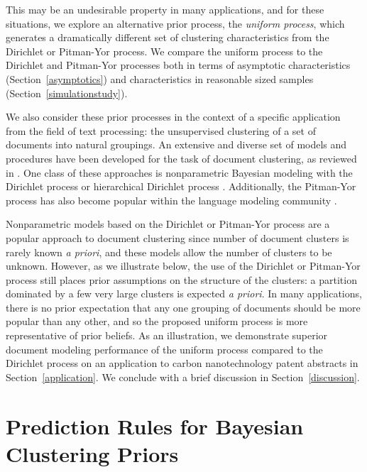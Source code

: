 \documentclass[]{article}
\begin{document}
This may be an undesirable property in many
applications, and for these situations, we explore an alternative
prior process, the {\it uniform process}, which generates a dramatically
different set of clustering characteristics from the Dirichlet or
Pitman-Yor process.  We compare the uniform process to the Dirichlet
and Pitman-Yor processes both in terms of asymptotic characteristics
(Section~\ref{asymptotics}) and characteristics in reasonable sized
samples (Section~\ref{simulationstudy}).    

We also consider these prior processes in the context of a specific
application from the field of text processing: the unsupervised
clustering of a set of documents into natural groupings.  An extensive
and diverse set of models and procedures have been developed for the
task of document clustering, as reviewed in \cite{AndFox07}.  One
class of these approaches is nonparametric Bayesian modeling with the
Dirichlet process \cite{ZhaGhaYan05} or hierarchical
Dirichlet process \cite{TehJorBea06}. Additionally, the Pitman-Yor
process has also become popular within the language modeling community
\cite{Teh06}.

Nonparametric models based on the Dirichlet or Pitman-Yor process are
a popular approach to document clustering since number of document
clusters is rarely known {\it a priori}, and these models allow the
number of clusters to be unknown.  However, as we illustrate below,
the use of the Dirichlet or Pitman-Yor process still places prior
assumptions on the structure of the clusters: a partition dominated by
a few very large clusters is expected {\it a priori}.  In many
applications, there is no prior expectation that any one grouping of
documents should be more popular than any other, and so the proposed
uniform process is more representative of prior beliefs.  As an
illustration, we demonstrate superior document modeling performance of
the uniform process compared to the Dirichlet process on an
application to carbon nanotechnology patent abstracts in
Section~\ref{application}.  We conclude with a brief discussion in
Section~\ref{discussion}.

\section{Prediction Rules for Bayesian Clustering Priors}\label{priors}
\end{document}
